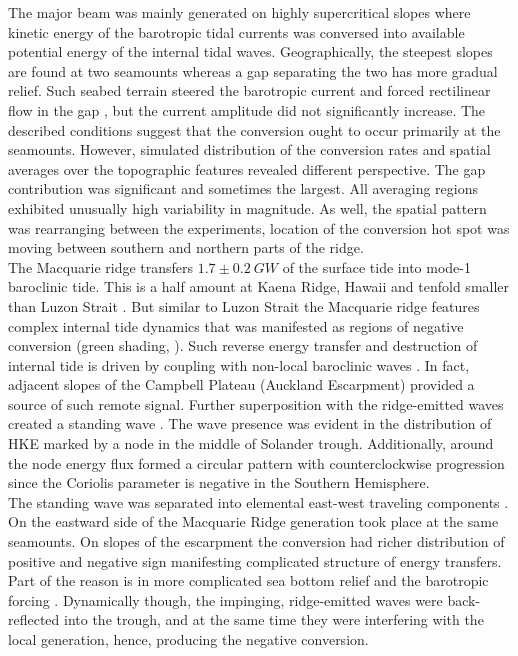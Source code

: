 \documentclass[12pt]{article}
\begin{document}
The major beam was mainly generated on highly supercritical slopes where kinetic energy of the 
barotropic tidal currents was conversed into available potential energy of the internal tidal 
waves. Geographically, the steepest slopes are found at two seamounts whereas a gap separating the 
two has more gradual relief. Such seabed terrain steered the barotropic 
current and forced rectilinear flow in the gap \citep{holloway1999internal}, but the current 
amplitude did not significantly increase. The described conditions suggest that the conversion 
ought to occur primarily 
at the 
seamounts. However, simulated distribution of the conversion rates  and 
spatial averages over the topographic features  revealed different 
perspective. The gap contribution was significant and sometimes the largest. All averaging 
regions   
exhibited 
unusually high variability in magnitude. As well, the spatial pattern was rearranging between 
the experiments, location of the conversion hot spot was moving between southern and northern 
parts of the ridge.\\

The Macquarie ridge transfers $1.7 \pm 0.2~GW$ of the surface tide into mode-1 baroclinic tide. 
This 
is a half amount at Kaena Ridge, Hawaii \citep{carter2008energetics} and tenfold smaller 
than Luzon Strait \citep{alford2011energy, kerry2014impact}. But similar to 
Luzon Strait the Macquarie ridge features complex internal tide dynamics that was manifested as 
regions of negative conversion (green shading, ). Such reverse energy 
transfer and destruction of internal tide is driven by coupling with non-local baroclinic waves 
\citep{Kelly2010a}. In 
fact, adjacent slopes of the Campbell Plateau 
(Auckland Escarpment) provided a source of such remote signal. Further superposition with the 
ridge-emitted waves created a standing wave . The wave presence was 
evident in the distribution of HKE marked by a node in the middle of Solander trough. Additionally, 
around the node energy flux formed a circular pattern  with 
counterclockwise progression since the Coriolis parameter is negative in the Southern Hemisphere.\\

The standing wave was separated into elemental east-west traveling components 
. On the eastward side of the Macquarie Ridge generation took 
place at the same seamounts. On slopes of the escarpment the conversion had richer 
distribution of positive and negative sign manifesting complicated structure of energy transfers. 
Part of the reason is in more complicated sea bottom relief and the barotropic forcing 
. Dynamically though, the impinging, ridge-emitted waves were 
back-reflected into the trough, and at the same time they were interfering with the local 
generation, 
hence, producing the negative conversion.\\
\end{document}
